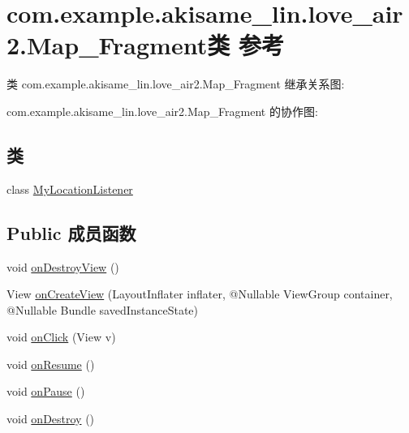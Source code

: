 \hypertarget{classcom_1_1example_1_1akisame__lin_1_1love__air2_1_1_map___fragment}{}\section{com.\+example.\+akisame\+\_\+lin.\+love\+\_\+air2.\+Map\+\_\+\+Fragment类 参考}
\label{classcom_1_1example_1_1akisame__lin_1_1love__air2_1_1_map___fragment}


类 com.\+example.\+akisame\+\_\+lin.\+love\+\_\+air2.\+Map\+\_\+\+Fragment 继承关系图\+:


com.\+example.\+akisame\+\_\+lin.\+love\+\_\+air2.\+Map\+\_\+\+Fragment 的协作图\+:
\subsection*{类}
\begin{DoxyCompactItemize}
\item 
class \mbox{\hyperlink{classcom_1_1example_1_1akisame__lin_1_1love__air2_1_1_map___fragment_1_1_my_location_listener}{My\+Location\+Listener}}
\end{DoxyCompactItemize}
\subsection*{Public 成员函数}
\begin{DoxyCompactItemize}
\item 
void \mbox{\hyperlink{classcom_1_1example_1_1akisame__lin_1_1love__air2_1_1_map___fragment_a9ff14ab4e2ecc9440ada98720b325100}{on\+Destroy\+View}} ()
\item 
View \mbox{\hyperlink{classcom_1_1example_1_1akisame__lin_1_1love__air2_1_1_map___fragment_a3bbc8ebf5dd7973d9e2d30c77af26097}{on\+Create\+View}} (Layout\+Inflater inflater, @Nullable View\+Group container, @Nullable Bundle saved\+Instance\+State)
\item 
void \mbox{\hyperlink{classcom_1_1example_1_1akisame__lin_1_1love__air2_1_1_map___fragment_a89fde30eb3c0774545f4f666288daf3a}{on\+Click}} (View v)
\item 
void \mbox{\hyperlink{classcom_1_1example_1_1akisame__lin_1_1love__air2_1_1_map___fragment_aa67035a9d5497c3232b78036af685bb2}{on\+Resume}} ()
\item 
void \mbox{\hyperlink{classcom_1_1example_1_1akisame__lin_1_1love__air2_1_1_map___fragment_a6bfd2bb6ea9778694df69d1b59872007}{on\+Pause}} ()
\item 
void \mbox{\hyperlink{classcom_1_1example_1_1akisame__lin_1_1love__air2_1_1_map___fragment_a8455df32098b75ce66487e5c2097fbee}{on\+Destroy}} ()
\end{DoxyCompactItemize}
